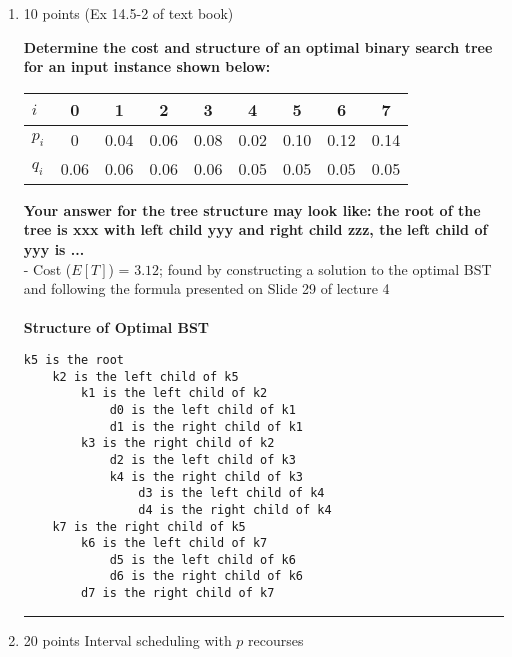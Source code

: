 \documentclass[letterpaper,12pt]{article}
\begin{document}
\begin{enumerate}
\noindent\rule{16cm}{0.1pt}

\item 10 points (Ex 14.5-2 of text book)

\textbf{Determine the cost and structure of an optimal binary search tree for an input 
instance shown below:}
\begin{table*}[h]
\begin{center}
\begin{tabular}{l|cccccccc}
$i$ & 0 & 1 & 2 & 3 & 4 & 5 & 6 & 7  \\ \hline
$p_i$ & 0 & 0.04 & 0.06 & 0.08 & 0.02 & 0.10 & 0.12 & 0.14 \\
$q_i$ & 0.06 & 0.06 & 0.06 & 0.06 & 0.05 & 0.05 & 0.05 & 0.05 
\end{tabular}
\end{center}
\end{table*}

\textbf{Your answer for the tree structure may look like: the root of the tree is
xxx with left child yyy and right child zzz, the left child of yyy is ...} \\
- Cost ($E[T]$) = $3.12$; found by constructing a solution to the optimal BST and following the formula presented on Slide 29 of lecture 4 \\ \\
\textbf{Structure of Optimal BST}
\begin{verbatim}
k5 is the root
    k2 is the left child of k5
        k1 is the left child of k2
            d0 is the left child of k1
            d1 is the right child of k1
        k3 is the right child of k2
            d2 is the left child of k3
            k4 is the right child of k3
                d3 is the left child of k4
                d4 is the right child of k4
    k7 is the right child of k5
        k6 is the left child of k7
            d5 is the left child of k6
            d6 is the right child of k6
        d7 is the right child of k7
\end{verbatim} 


\noindent\rule{16cm}{0.1pt}

\item 20 points Interval scheduling with $p$ recourses


\end{enumerate}
\end{document}
